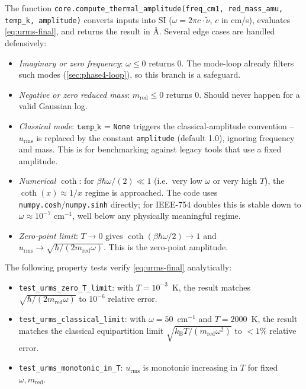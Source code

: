 \documentclass[10pt,a4paper,twoside]{article}
\newcommand{\kB}{k_{\mathrm{B}}}
\newcommand{\urms}{u_{\mathrm{rms}}}
\newcommand{\fn}[1]{\texttt{#1}}
\newcommand{\cfgkey}[1]{\texttt{#1}}
\begin{document}
The function \fn{core.compute\_thermal\_amplitude(freq\_cm1,
red\_mass\_amu, temp\_k, amplitude)} converts inputs into SI
($\omega = 2\pi c \cdot \tilde\nu$, $c$ in cm/s), evaluates
\cref{eq:urms-final}, and returns the result in \AA{}. Several edge
cases are handled defensively:

\begin{itemize}
  \item \emph{Imaginary or zero frequency}: $\omega \leq 0$ returns
        $0$. The mode-loop already filters such modes
        (\cref{sec:phase4-loop}), so this branch is a safeguard.
  \item \emph{Negative or zero reduced mass}: $m_\text{red} \leq 0$
        returns $0$. Should never happen for a valid Gaussian log.
  \item \emph{Classical mode}: $\texttt{temp\_k}$ = \texttt{None}
        triggers the classical-amplitude convention -- $\urms$ is
        replaced by the constant \cfgkey{amplitude} (default 1.0),
        ignoring frequency and mass. This is for benchmarking against
        legacy tools that use a fixed amplitude.
  \item \emph{Numerical $\coth$}: for $\beta\hbar\omega/(2) \ll 1$
        (i.e.\ very low $\omega$ or very high $T$), the
        $\coth(x) \approx 1/x$ regime is approached. The code uses
        \fn{numpy.cosh}/\fn{numpy.sinh} directly; for IEEE-754 doubles
        this is stable down to $\omega \approx 10^{-7}$ cm$^{-1}$,
        well below any physically meaningful regime.
  \item \emph{Zero-point limit}: $T \to 0$ gives
        $\coth(\beta\hbar\omega/2) \to 1$ and
        $\urms \to \sqrt{\hbar/(2 m_\text{red}\omega)}$. This is the
        zero-point amplitude.
\end{itemize}

\begin{derivbox}
The following property tests verify \cref{eq:urms-final}
analytically:
\begin{itemize}
  \item \fn{test\_urms\_zero\_T\_limit}: with
        $T = 10^{-3}$~K, the result matches
        $\sqrt{\hbar/(2 m_\text{red}\omega)}$ to $10^{-6}$
        relative error.
  \item \fn{test\_urms\_classical\_limit}: with $\omega = 50$~cm$^{-1}$
        and $T = 2000$~K, the result matches the classical
        equipartition limit $\sqrt{\kB T/(m_\text{red}\omega^2)}$ to
        $< 1\%$ relative error.
  \item \fn{test\_urms\_monotonic\_in\_T}: $\urms$ is monotonic
        increasing in $T$ for fixed $\omega, m_\text{red}$.
\end{itemize}
\end{derivbox}
\end{document}
